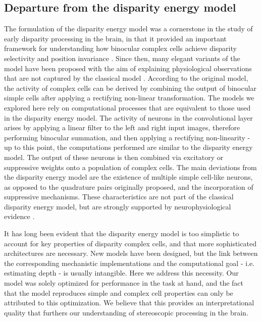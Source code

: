 \subsection{Departure from the disparity energy model}
The formulation of the disparity energy model \cite{Ohzawa:1990cq} was a cornerstone in the study of early disparity processing in the brain, in that it provided an important framework for understanding how binocular complex cells achieve disparity selectivity and position invariance \cite{Qian:1994:CSD:1362347.1362350}. Since then, many elegant variants of the model have been proposed with the aim of explaining physiological observations that are not captured by the classical model \cite{Read:2002kx,Haefner:2008jg,Samonds:2013cs}. According to the original model, the activity of complex cells can be derived by combining the output of binocular simple cells after applying a rectifying non-linear transformation. The models we explored here rely on computational processes that are equivalent to those used in the disparity energy model. The activity of neurons in the convolutional layer arises by applying a linear filter to the left and right input images, therefore performing binocular summation, and then applying a rectifying non-linearity - up to this point, the computations performed are similar to the disparity energy model. The output of these neurons is then combined via excitatory or suppressive weights onto a population of complex cells. The main deviations from the disparity energy model are the existence of multiple simple cell-like neurons, as opposed to the quadrature pairs originally proposed, and the incorporation of suppressive mechanisms. These characteristics are not part of the classical disparity energy model, but are strongly supported by neurophysiological evidence \cite{Haefner:2008jg,Tanabe:2011pt,Baba:2015ij}.

It has long been evident that the disparity energy model is too simplistic to account for key properties of disparity complex cells, and that more sophisticated architectures are necessary. New models have been designed, but the link between the corresponding mechanistic implementations and the computational goal - i.e. estimating depth - is usually intangible. Here we address this necessity. Our model was solely optimized for performance in the task at hand, and the fact that the model reproduces simple and complex cell properties can only be attributed to this optimization. We believe that this provides an interpretational quality that furthers our understanding of stereoscopic processing in the brain.




